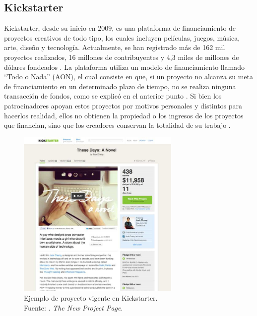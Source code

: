 \subsection{Kickstarter}
Kickstarter, desde su inicio en 2009, es una plataforma de financiamiento de proyectos creativos de todo tipo, los cuales incluyen películas, juegos, música, arte, diseño y tecnología. Actualmente, se han registrado más de 162 mil proyectos realizados, 16 millones de contribuyentes y 4,3 miles de millones de dólares fondeados \parencite{cr_kickstarter_about}. La plataforma utiliza un modelo de financiamiento llamado “Todo o Nada” (AON), el cual consiste en que, si un proyecto no alcanza su meta de financiamiento en un determinado plazo de tiempo, no se realiza ninguna transacción de fondos, como se explicó en el anterior punto \parencite{cr_kickstarter_founding}. Si bien los patrocinadores apoyan estos proyectos por motivos personales y distintos para hacerlos realidad, ellos no obtienen la propiedad o los ingresos de los proyectos que financian, sino que los creadores conservan la totalidad de su trabajo \parencite{cr_kickstarter_press}.

\begin{figure}[!ht]
	\begin{center}
		\includegraphics[width=0.70\textwidth]{2/figures/kickstarter_project.jpg}
		\caption[Ejemplo de proyecto vigente en Kickstarter]{Ejemplo de proyecto vigente en Kickstarter.\\
			Fuente: \cite{cr_perry2012kickstarterproject}. \textit{The New Project Page}.}
		\label{2:fig51}
	\end{center}
\end{figure}

